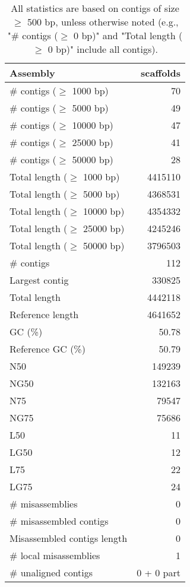 \documentclass[12pt,a4paper]{article}
\begin{document}
\begin{table}[ht]
\begin{center}
\caption{All statistics are based on contigs of size $\geq$ 500 bp, unless otherwise noted (e.g., "\# contigs ($\geq$ 0 bp)" and "Total length ($\geq$ 0 bp)" include all contigs).}
\begin{tabular}{|l*{1}{|r}|}
\hline
Assembly & scaffolds \\ \hline
\# contigs ($\geq$ 1000 bp) & 70 \\ \hline
\# contigs ($\geq$ 5000 bp) & 49 \\ \hline
\# contigs ($\geq$ 10000 bp) & 47 \\ \hline
\# contigs ($\geq$ 25000 bp) & 41 \\ \hline
\# contigs ($\geq$ 50000 bp) & 28 \\ \hline
Total length ($\geq$ 1000 bp) & 4415110 \\ \hline
Total length ($\geq$ 5000 bp) & 4368531 \\ \hline
Total length ($\geq$ 10000 bp) & 4354332 \\ \hline
Total length ($\geq$ 25000 bp) & 4245246 \\ \hline
Total length ($\geq$ 50000 bp) & 3796503 \\ \hline
\# contigs & 112 \\ \hline
Largest contig & 330825 \\ \hline
Total length & 4442118 \\ \hline
Reference length & 4641652 \\ \hline
GC (\%) & 50.78 \\ \hline
Reference GC (\%) & 50.79 \\ \hline
N50 & 149239 \\ \hline
NG50 & 132163 \\ \hline
N75 & 79547 \\ \hline
NG75 & 75686 \\ \hline
L50 & 11 \\ \hline
LG50 & 12 \\ \hline
L75 & 22 \\ \hline
LG75 & 24 \\ \hline
\# misassemblies & 0 \\ \hline
\# misassembled contigs & 0 \\ \hline
Misassembled contigs length & 0 \\ \hline
\# local misassemblies & 1 \\ \hline
\# unaligned contigs & 0 + 0 part \\ \hline

\end{tabular}
\end{center}
\end{table}
\end{document}
